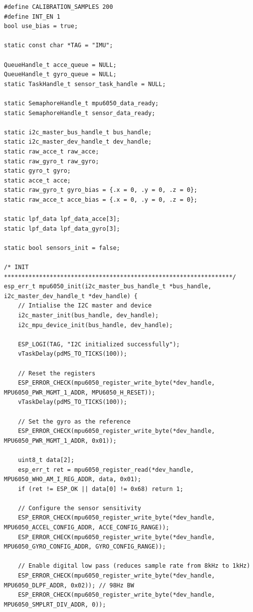 \begin{lstlisting}[caption={Register Read}]
#define CALIBRATION_SAMPLES 200
#define INT_EN 1
bool use_bias = true;

static const char *TAG = "IMU";

QueueHandle_t acce_queue = NULL;
QueueHandle_t gyro_queue = NULL;
static TaskHandle_t sensor_task_handle = NULL;

static SemaphoreHandle_t mpu6050_data_ready;
static SemaphoreHandle_t sensor_data_ready;

static i2c_master_bus_handle_t bus_handle;
static i2c_master_dev_handle_t dev_handle;
static raw_acce_t raw_acce; 
static raw_gyro_t raw_gyro;
static gyro_t gyro;
static acce_t acce;
static raw_gyro_t gyro_bias = {.x = 0, .y = 0, .z = 0};
static raw_acce_t acce_bias = {.x = 0, .y = 0, .z = 0};

static lpf_data lpf_data_acce[3];
static lpf_data lpf_data_gyro[3];

static bool sensors_init = false;

/* INIT *****************************************************************/
esp_err_t mpu6050_init(i2c_master_bus_handle_t *bus_handle, i2c_master_dev_handle_t *dev_handle) {
    // Intialise the I2C master and device
    i2c_master_init(bus_handle, dev_handle);
    i2c_mpu_device_init(bus_handle, dev_handle);

    ESP_LOGI(TAG, "I2C initialized successfully");
    vTaskDelay(pdMS_TO_TICKS(100)); 
    
    // Reset the registers
    ESP_ERROR_CHECK(mpu6050_register_write_byte(*dev_handle, MPU6050_PWR_MGMT_1_ADDR, MPU6050_H_RESET));
    vTaskDelay(pdMS_TO_TICKS(100)); 
    
    // Set the gyro as the reference
    ESP_ERROR_CHECK(mpu6050_register_write_byte(*dev_handle, MPU6050_PWR_MGMT_1_ADDR, 0x01));

    uint8_t data[2];
    esp_err_t ret = mpu6050_register_read(*dev_handle, MPU6050_WHO_AM_I_REG_ADDR, data, 0x01);
    if (ret != ESP_OK || data[0] != 0x68) return 1;
        
    // Configure the sensor sensitivity
    ESP_ERROR_CHECK(mpu6050_register_write_byte(*dev_handle, MPU6050_ACCEL_CONFIG_ADDR, ACCE_CONFIG_RANGE));
    ESP_ERROR_CHECK(mpu6050_register_write_byte(*dev_handle, MPU6050_GYRO_CONFIG_ADDR, GYRO_CONFIG_RANGE));

    // Enable digital low pass (reduces sample rate from 8kHz to 1kHz)
    ESP_ERROR_CHECK(mpu6050_register_write_byte(*dev_handle, MPU6050_DLPF_ADDR, 0x02)); // 98Hz BW
    ESP_ERROR_CHECK(mpu6050_register_write_byte(*dev_handle, MPU6050_SMPLRT_DIV_ADDR, 0));


\end{lstlisting}
